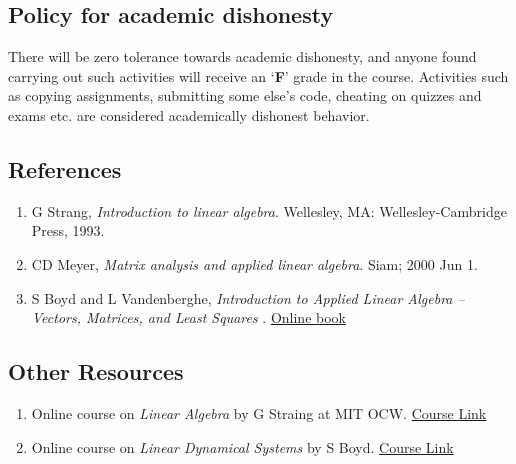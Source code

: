 \documentclass[fontsize=9pt]{scrbook}
\begin{document}
\begin{multicols}{2}
\subsection*{Policy for academic dishonesty}
There will be zero tolerance towards academic dishonesty, and anyone found carrying out such activities will receive an `\textbf{F}' grade in the course. Activities such as copying assignments, submitting some else's code, cheating on quizzes and exams etc. are considered academically dishonest behavior.


\subsection*{References}
\begin{enumerate}
    \item G Strang, \textit{Introduction to linear algebra}. Wellesley, MA: Wellesley-Cambridge Press, 1993.
    \item CD Meyer, \textit{Matrix analysis and applied linear algebra}. Siam; 2000 Jun 1.
    \item S Boyd and L Vandenberghe, \textit{Introduction to Applied Linear Algebra – Vectors, Matrices, and Least Squares} . \href{https://web.stanford.edu/~boyd/vmls/}{Online book}
\end{enumerate}


\subsection*{Other Resources}
\begin{enumerate}
    \item Online course on \textit{Linear Algebra} by G Straing at MIT OCW. \href{https://goo.gl/VUy64k}{Course Link}
    \item Online course on \textit{Linear Dynamical Systems} by S Boyd. \href{https://see.stanford.edu/Course/EE263}{Course Link}
\end{enumerate}



\end{multicols}
\end{document}
